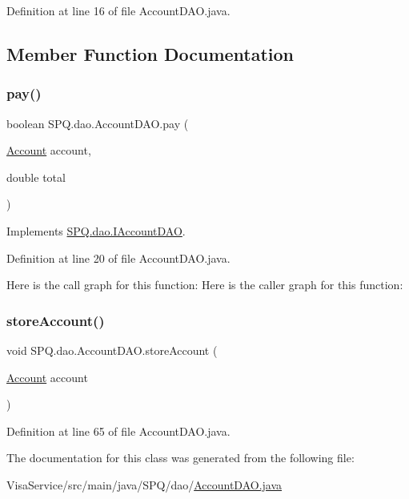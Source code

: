 Definition at line 16 of file Account\+D\+A\+O.\+java.



\subsection{Member Function Documentation}
\mbox{\label{class_s_p_q_1_1dao_1_1_account_d_a_o_ad40cd6129f180d4cb235c00756b53930}} 
\subsubsection{\texorpdfstring{pay()}{pay()}}
{\footnotesize\ttfamily boolean S\+P\+Q.\+dao.\+Account\+D\+A\+O.\+pay (\begin{DoxyParamCaption}\item[{\mbox{\hyperlink{class_s_p_q_1_1data_1_1_account}{Account}}}]{account,  }\item[{double}]{total }\end{DoxyParamCaption})}



Implements \mbox{\hyperlink{interface_s_p_q_1_1dao_1_1_i_account_d_a_o_aa1e3f13d419f23fc0cb5c98cd4cc5eb4}{S\+P\+Q.\+dao.\+I\+Account\+D\+AO}}.



Definition at line 20 of file Account\+D\+A\+O.\+java.

Here is the call graph for this function\+:
Here is the caller graph for this function\+:
\mbox{\label{class_s_p_q_1_1dao_1_1_account_d_a_o_abe750b9b11a2c7d398c4d8676b053f99}} 
\subsubsection{\texorpdfstring{store\+Account()}{storeAccount()}}
{\footnotesize\ttfamily void S\+P\+Q.\+dao.\+Account\+D\+A\+O.\+store\+Account (\begin{DoxyParamCaption}\item[{\mbox{\hyperlink{class_s_p_q_1_1data_1_1_account}{Account}}}]{account }\end{DoxyParamCaption})}



Definition at line 65 of file Account\+D\+A\+O.\+java.



The documentation for this class was generated from the following file\+:\begin{DoxyCompactItemize}
\item 
Visa\+Service/src/main/java/\+S\+P\+Q/dao/\mbox{\hyperlink{_account_d_a_o_8java}{Account\+D\+A\+O.\+java}}\end{DoxyCompactItemize}
